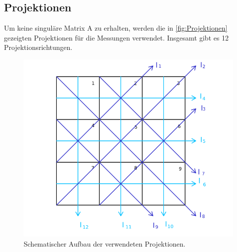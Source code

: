\subsection{Projektionen}
Um keine singuläre Matrix A zu erhalten, werden die in \autoref{fig:Projektionen} gezeigten Projektionen für die Messungen verwendet.
Insgesamt gibt es 12 Projektionsrichtungen.

\begin{figure}[H]
    \centering
    \includegraphics[width=\textwidth]{bilder/projektionen.png}
    \caption{Schematischer Aufbau der verwendeten Projektionen.}
    \label{fig:Projektionen}
\end{figure}

